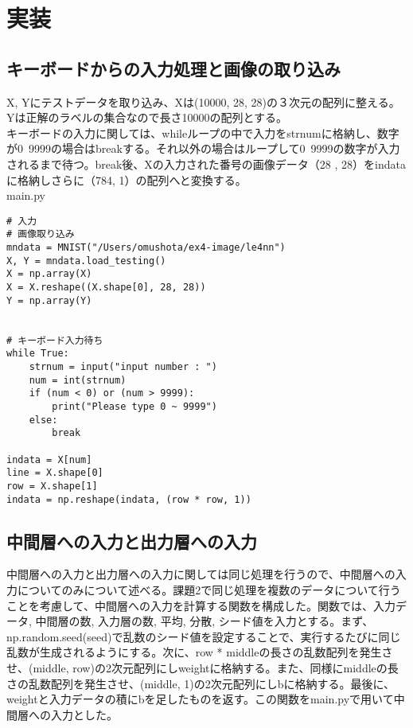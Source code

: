 \documentclass{ujarticle}
\begin{document}
\section{実装}
\subsection{キーボードからの入力処理と画像の取り込み}
X, Yにテストデータを取り込み、Xは(10000, 28, 28)の３次元の配列に整える。Yは正解のラベルの集合なので長さ10000の配列とする。\\
キーボードの入力に関しては、whileループの中で入力をstrnumに格納し、数字が0~9999の場合はbreakする。それ以外の場合はループして0~9999の数字が入力されるまで待つ。break後、Xの入力された番号の画像データ（28 , 28）をindataに格納しさらに（784, 1）の配列へと変換する。\\

main.py
\begin{lstlisting}[basicstyle=\ttfamily\footnotesize, frame=single]
# 入力
# 画像取り込み
mndata = MNIST("/Users/omushota/ex4-image/le4nn")
X, Y = mndata.load_testing()
X = np.array(X)
X = X.reshape((X.shape[0], 28, 28))
Y = np.array(Y)


# キーボード入力待ち
while True:
    strnum = input("input number : ")
    num = int(strnum)
    if (num < 0) or (num > 9999):
        print("Please type 0 ~ 9999")
    else:
        break

indata = X[num]
line = X.shape[0]
row = X.shape[1]
indata = np.reshape(indata, (row * row, 1))
\end{lstlisting}


\subsection{中間層への入力と出力層への入力}
中間層への入力と出力層への入力に関しては同じ処理を行うので、中間層への入力についてのみについて述べる。課題2で同じ処理を複数のデータについて行うことを考慮して、中間層への入力を計算する関数を構成した。関数では、入力データ, 中間層の数, 入力層の数, 平均, 分散, シード値を入力とする。まず、np.random.seed(seed)で乱数のシード値を設定することで、実行するたびに同じ乱数が生成されるようにする。次に、row * middleの長さの乱数配列を発生させ、(middle, row)の2次元配列にしweightに格納する。また、同様にmiddleの長さの乱数配列を発生させ、(middle, 1)の2次元配列にしbに格納する。最後に、weightと入力データの積にbを足したものを返す。この関数をmain.pyで用いて中間層への入力とした。\\
\end{document}
